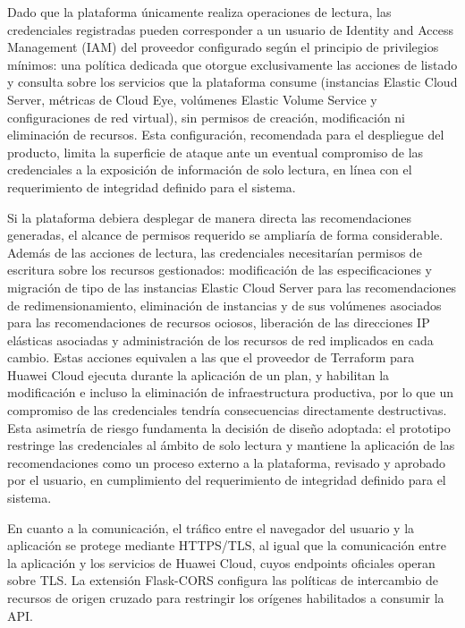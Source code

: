 Dado que la plataforma únicamente realiza operaciones de lectura, las credenciales registradas pueden corresponder a un usuario de Identity and Access Management (IAM) del proveedor configurado según el principio de privilegios mínimos: una política dedicada que otorgue exclusivamente las acciones de listado y consulta sobre los servicios que la plataforma consume (instancias Elastic Cloud Server, métricas de Cloud Eye, volúmenes Elastic Volume Service y configuraciones de red virtual), sin permisos de creación, modificación ni eliminación de recursos. Esta configuración, recomendada para el despliegue del producto, limita la superficie de ataque ante un eventual compromiso de las credenciales a la exposición de información de solo lectura, en línea con el requerimiento de integridad definido para el sistema.

Si la plataforma debiera desplegar de manera directa las recomendaciones generadas, el alcance de permisos requerido se ampliaría de forma considerable. Además de las acciones de lectura, las credenciales necesitarían permisos de escritura sobre los recursos gestionados: modificación de las especificaciones y migración de tipo de las instancias Elastic Cloud Server para las recomendaciones de redimensionamiento, eliminación de instancias y de sus volúmenes asociados para las recomendaciones de recursos ociosos, liberación de las direcciones IP elásticas asociadas y administración de los recursos de red implicados en cada cambio. Estas acciones equivalen a las que el proveedor de Terraform para Huawei Cloud ejecuta durante la aplicación de un plan, y habilitan la modificación e incluso la eliminación de infraestructura productiva, por lo que un compromiso de las credenciales tendría consecuencias directamente destructivas. Esta asimetría de riesgo fundamenta la decisión de diseño adoptada: el prototipo restringe las credenciales al ámbito de solo lectura y mantiene la aplicación de las recomendaciones como un proceso externo a la plataforma, revisado y aprobado por el usuario, en cumplimiento del requerimiento de integridad definido para el sistema.

En cuanto a la comunicación, el tráfico entre el navegador del usuario y la aplicación se protege mediante HTTPS/TLS, al igual que la comunicación entre la aplicación y los servicios de Huawei Cloud, cuyos endpoints oficiales operan sobre TLS. La extensión Flask-CORS configura las políticas de intercambio de recursos de origen cruzado para restringir los orígenes habilitados a consumir la API.

